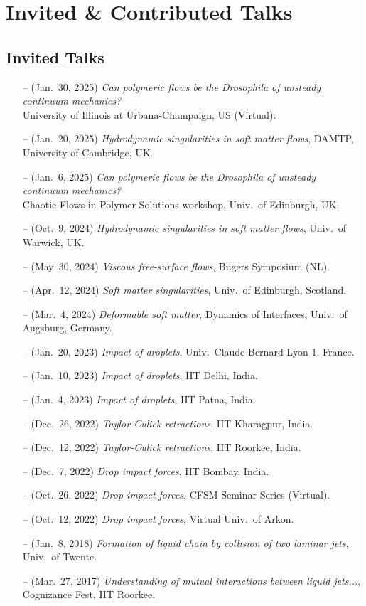 \documentclass[10pt,a4paper,colorlinks,linkcolor=blue,urlcolor=blue,citecolor=blue]{moderncv}
\begin{document}
\section{Invited \& Contributed Talks}

\subsection{Invited Talks}
\begin{itemize}[leftmargin=1.25em]
\item[--] (Jan.~30, 2025) \emph{Can polymeric flows be the Drosophila of unsteady continuum mechanics?} \\
  University of Illinois at Urbana-Champaign, US (Virtual).
\item[--] (Jan.~20, 2025) \emph{Hydrodynamic singularities in soft matter flows}, DAMTP, University of Cambridge, UK.
\item[--] (Jan.~6, 2025) \emph{Can polymeric flows be the Drosophila of unsteady continuum mechanics?}\\
  Chaotic Flows in Polymer Solutions workshop, Univ.~of Edinburgh, UK.
\item[--] (Oct.~9, 2024) \emph{Hydrodynamic singularities in soft matter flows}, Univ.~of Warwick, UK.
\item[--] (May~30, 2024) \emph{Viscous free-surface flows}, Bugers Symposium (NL).
\item[--] (Apr.~12, 2024) \emph{Soft matter singularities}, Univ.~of Edinburgh, Scotland.
\item[--] (Mar.~4, 2024) \emph{Deformable soft matter}, Dynamics of Interfaces, Univ.~of Augsburg, Germany.
\item[--] (Jan.~20, 2023) \emph{Impact of droplets}, Univ.~Claude Bernard Lyon 1, France.
\item[--] (Jan.~10, 2023) \emph{Impact of droplets}, IIT Delhi, India.
\item[--] (Jan.~4, 2023) \emph{Impact of droplets}, IIT Patna, India.
\item[--] (Dec.~26, 2022) \emph{Taylor-Culick retractions}, IIT Kharagpur, India.
\item[--] (Dec.~12, 2022) \emph{Taylor-Culick retractions}, IIT Roorkee, India.
\item[--] (Dec.~7, 2022) \emph{Drop impact forces}, IIT Bombay, India.
\item[--] (Oct.~26, 2022) \emph{Drop impact forces}, CFSM Seminar Series (Virtual).
\item[--] (Oct.~12, 2022) \emph{Drop impact forces}, Virtual Univ.~of Arkon.
\item[--] (Jan.~8, 2018) \emph{Formation of liquid chain by collision of two laminar jets}, Univ.~of Twente.
\item[--] (Mar.~27, 2017) \emph{Understanding of mutual interactions between liquid jets...}, Cognizance Fest, IIT Roorkee.
\end{itemize}
\end{document}
